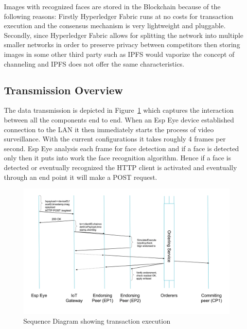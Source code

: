 Images with recognized faces are stored in the Blockchain because of the following reasons: Firstly Hyperledger Fabric runs at no costs for transaction execution and the consensus mechanism is very lightweight and pluggable. Secondly, since Hyperledger Fabric allows for splitting the network into multiple smaller networks in order to preserve privacy between competitors then storing images in some other third party such as IPFS would vaporize the concept of channeling and IPFS does not offer the same characteristics. 


\subsection{Transmission Overview}

The data transmission is depicted in Figure~\ref{fig:seqdiag} which captures the interaction between all the components end to end. When an Esp Eye device established connection to the LAN it then immediately starts the process of video surveillance. With the current configurations it takes roughly 4 frames per second. Esp Eye analysis each frame for face detection and if a face is detected only then it puts into work the face recognition algorithm. Hence if a face is detected or eventually recognized the HTTP client is activated and eventually through an end point it will make a POST request. 






\begin{figure}[!htb]
    \centering
    \includegraphics[width=1\textwidth]{figures/sequencediagram1.png}
    \caption{Sequence Diagram showing transaction execution}
    \label{fig:seqdiag}
\end{figure}





